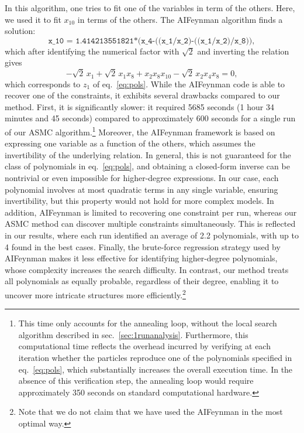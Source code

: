 \documentclass[11pt,a4paper]{article}
\begin{document}
In this algorithm, one tries to fit one of the variables in term of the others. Here, we used it to fit $x_{10}$ in terms of the others. The AIFeynman algorithm finds a solution: 
\begin{equation}
	\texttt{x\_10 = 1.414213551821*(x\_4-((x\_1/x\_2)-((x\_1/x\_2)/x\_8))},
\end{equation}
which after identifying the numerical factor with $\sqrt 2$ and inverting the relation gives 
\begin{equation}
	- \sqrt 2\, x_1 + \sqrt 2\, x_1 x_8 + x_2 x_8  x_{10} -\sqrt 2\, x_2 x_4 x_8 = 0,
\end{equation}
which corresponds to $z_1$ of eq.~\eqref{eq:pols}. While the AIFeynman code is able to recover one of the constraints, it exhibits several drawbacks compared to our method. First, it is significantly slower: it required 5685 seconds (1 hour 34 minutes and 45 seconds) compared to approximately 600 seconds for a single run of our ASMC algorithm.\footnote{This time only accounts for the annealing loop, without the local search algorithm described in sec.~\ref{sec:1runanalysis}. Furthermore, this computational time reflects the overhead incurred by verifying at each iteration whether the particles reproduce one of the polynomials specified in eq.~\eqref{eq:pols}, which substantially increases the overall execution time. In the absence of this verification step, the annealing loop would require approximately 350 seconds on standard computational hardware.} Moreover, the AIFeynman framework is based on expressing one variable as a function of the others, which assumes the invertibility of the underlying relation. In general, this is not guaranteed for the class of polynomials in eq.~\eqref{eq:pols}, and obtaining a closed-form inverse can be nontrivial or even impossible for higher-degree expressions. In our case, each polynomial involves at most quadratic terms in any single variable, ensuring invertibility, but this property would not hold for more complex models. In addition, AIFeynman is limited to recovering one constraint per run, whereas our ASMC method can discover multiple constraints simultaneously. This is reflected in our results, where each run identified an average of 2.2 polynomials, with up to 4 found in the best cases. Finally, the brute-force regression strategy used by AIFeynman makes it less effective for identifying higher-degree polynomials, whose complexity increases the search difficulty. In contrast, our method treats all polynomials as equally probable, regardless of their degree, enabling it to uncover more intricate structures more efficiently.\footnote{Note that we do not claim that we have used the AIFeynman in the most optimal way.}
\end{document}
